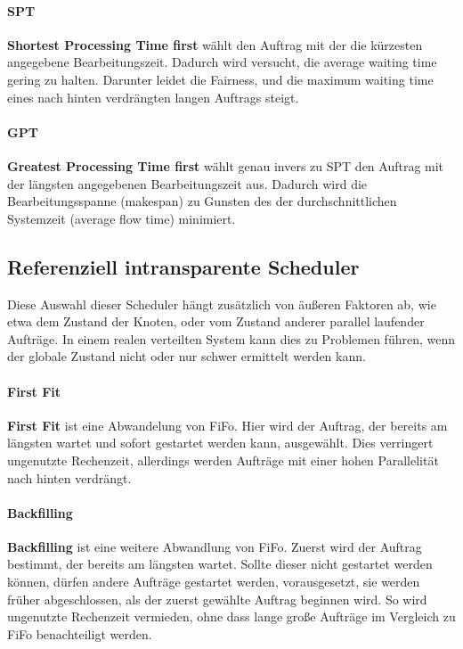 \paragraph{SPT}
\textbf{Shortest Processing Time first} wählt den Auftrag mit der die kürzesten angegebene Bearbeitungszeit. Dadurch wird versucht, die average waiting time gering zu halten. Darunter leidet die Fairness, und die maximum waiting time eines nach hinten verdrängten langen Auftrags steigt.

\paragraph{GPT}
\textbf{Greatest Processing Time first} wählt genau invers zu SPT den Auftrag mit der längsten angegebenen Bearbeitungszeit aus. Dadurch wird die Bearbeitungsspanne (makespan) zu Gunsten des der durchschnittlichen Systemzeit (average flow time) minimiert.

\subsection{Referenziell intransparente Scheduler}
Diese Auswahl dieser Scheduler hängt zusätzlich von äußeren Faktoren ab, wie etwa dem Zustand der Knoten, oder vom Zustand anderer parallel laufender Aufträge. In einem realen verteilten System kann dies zu Problemen führen, wenn der globale Zustand nicht oder nur schwer ermittelt werden kann.

\paragraph{First Fit}
\textbf{First Fit} ist eine Abwandelung von FiFo. Hier wird  der Auftrag, der bereits am längsten wartet und sofort gestartet werden kann, ausgewählt. Dies verringert ungenutzte Rechenzeit, allerdings werden Aufträge mit einer hohen Parallelität nach hinten verdrängt.

\paragraph{Backfilling}
\textbf{Backfilling} ist eine weitere Abwandlung von FiFo. Zuerst wird der Auftrag bestimmt, der bereits am längsten wartet. Sollte dieser nicht gestartet werden können, dürfen andere Aufträge gestartet werden, vorausgesetzt, sie werden früher abgeschlossen, als der zuerst gewählte Auftrag beginnen wird. So wird ungenutzte Rechenzeit vermieden, ohne dass lange große Aufträge im Vergleich zu FiFo benachteiligt werden.

